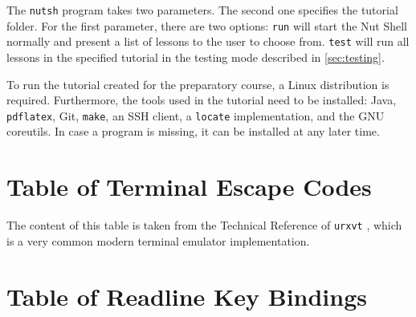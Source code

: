 \documentclass[paper=a4,twoside,abstract=on,cleardoublepage=empty,numbers=noenddot,toc=bib,12pt,appendixprefix=true]{scrreprt}
\begin{document}
The \texttt{nutsh} program takes two parameters. The second one specifies the tutorial folder. For the first parameter, there are two options: \texttt{run} will start the Nut Shell normally and present a list of lessons to the user to choose from. \texttt{test} will run all lessons in the specified tutorial in the testing mode described in \cref{sec:testing}.

To run the tutorial created for the preparatory course, a Linux distribution is required. Furthermore, the tools used in the tutorial need to be installed: Java, \texttt{pdflatex}, Git, \texttt{make}, an SSH client, a \texttt{locate} implementation, and the GNU coreutils. In case a program is missing, it can be installed at any later time.

\chapter{Table of Terminal Escape Codes}
\label{sec:esc}

The content of this table is taken from the Technical Reference of \texttt{urxvt} \cite{}, which is a very common modern terminal emulator implementation.


\chapter{Table of Readline Key Bindings}
\label{sec:keybindings}


\nocite{why05}
\nocite{fowler10}
\nocite{upt02}
\nocite{dragonbook06}
\nocite{louden03}

%
\printbibliography
\end{document}

